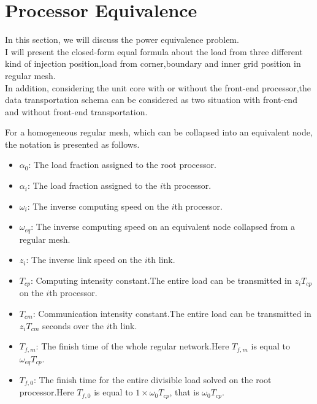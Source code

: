 \section{Processor Equivalence}
In this section, we will discuss the power equivalence problem.
\\
I will present the closed-form equal formula about the load from three different kind of injection position,load from corner,boundary and inner grid position in regular mesh.
\\
In addition, considering the unit core with or without the front-end processor,the data transportation schema can be considered as two situation with front-end  and without front-end transportation.

\vspace*{5pt}

For a homogeneous regular mesh, which can be collapsed into an equivalent node, the notation is presented as follows.\\

\begin{itemize}

\item $\alpha_{0}$: The load fraction assigned to the root processor.
\item $\alpha_{i}$: The load fraction assigned to the $i$th processor.
\item $\omega_{i}$: The inverse computing speed on the $i$th processor.
\item $\omega_{eq}$: The inverse computing speed on an equivalent node collapsed from a regular mesh.
\item $z_{i}$: The inverse link speed on the $i$th link.
\item $T_{cp}$: Computing intensity constant.The entire load can be transmitted in $z_{i}T_{cp}$ on the $i$th processor.
\item $T_{cm}$: Communication intensity constant.The entire load can be transmitted in $z_{i}T_{cm}$ seconds over the $i$th link.
\item $T_{f,m}$: The finish time of the whole regular network.Here $T_{f,m}$ is equal to $\omega_{eq}T_{cp}$.
\item $T_{f,0}$: The finish time for the entire divisible load solved on the root processor.Here $T_{f,0}$ is equal to $1 \times \omega_{0}T_{cp}$, that is $\omega_{0}T_{cp}$.

\end{itemize}
\vspace*{5pt}

\vspace*{5pt}

\vspace*{5pt}


